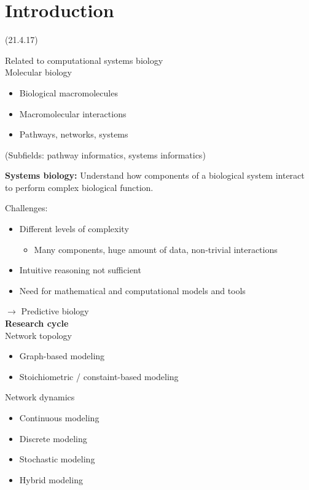   \chapter{Introduction}
    \begin{lecture}
      (21.4.17)
    \end{lecture}
    Related to computational systems biology\\
    Molecular biology
    \begin{itemize}
      \item Biological macromolecules
      \item Macromolecular interactions
      \item Pathways, networks, systems
    \end{itemize}
    (Subfields: pathway informatics, systems informatics)
    \begin{definition}
      \textbf{Systems biology:} Understand how components of a biological system interact to perform complex biological function.
    \end{definition}
    Challenges:
    \begin{itemize}
      \item Different levels of complexity
      \begin{itemize}
        \item Many components, huge amount of data, non-trivial interactions
      \end{itemize}
      \item Intuitive reasoning not sufficient
      \item Need for mathematical and computational models and tools
    \end{itemize}
    $\rightarrow$ Predictive biology\\
    \textbf{Research cycle}
    \\

    Network topology
    \begin{itemize}
      \item Graph-based modeling
      \item Stoichiometric / constaint-based modeling
    \end{itemize}
    Network dynamics
    \begin{itemize}
      \item Continuous modeling
      \item Discrete modeling
      \item Stochastic modeling
      \item Hybrid modeling
    \end{itemize}


